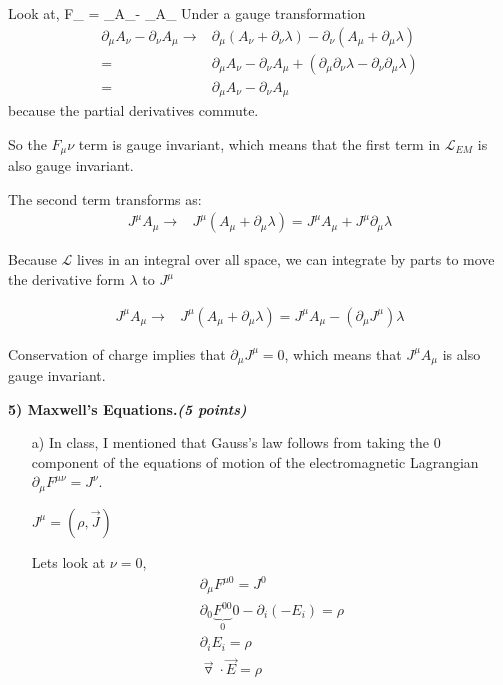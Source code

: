 {{Look at,
\be
F_{\mu\nu} = \partial_\mu A_\nu - \partial_\nu A_\mu
\ee
Under a gauge transformation
\begin{eqnarray*}
\partial_\mu A_\nu - \partial_\nu A_\mu \rightarrow& \partial_\mu (A_\nu + \partial_\nu \lambda) - \partial_\nu (A_\mu + \partial_\mu \lambda)\\
                                        =& \partial_\mu A_\nu - \partial_\nu A_\mu  + (\partial_\mu \partial_\nu \lambda - \partial_\nu \partial_\mu \lambda)\\
                                        =& \partial_\mu A_\nu - \partial_\nu A_\mu  
\end{eqnarray*}
because the partial derivatives commute.

So the $F_\mu\nu$ term is gauge invariant, which means that the first term in $\mathscr{L}_{EM}$ is also gauge invariant.

The second term transforms as:
\begin{eqnarray*}
J^\mu A_\mu \rightarrow& J^\mu(A_\mu + \partial_\mu \lambda) = J^\mu A_\mu + J^\mu  \partial_\mu \lambda
\end{eqnarray*}

Because $\mathscr{L}$ lives in an integral over all space, we can integrate by parts to move the derivative form $\lambda$ to $J^\mu$

\begin{eqnarray*}
J^\mu A_\mu \rightarrow& J^\mu(A_\mu + \partial_\mu \lambda) = J^\mu A_\mu - (\partial_\mu J^\mu)\lambda
\end{eqnarray*}

Conservation of charge implies that $\partial_\mu J^\mu = 0$, which means that $J^\mu A_\mu$ is also gauge invariant.


\vspace*{0.25in}




\textbf{5) Maxwell’s Equations.\hfill \textit{(5 points)}}
\begin{itemize}
\item[a)]In class,  I mentioned  that Gauss’s law follows from taking the 0 component of the equations of motion of the electromagnetic Lagrangian $\partial_\mu F^{\mu\nu} = J^\nu$. 

$J^\mu = (\rho, \vec{J})$

Lets look at $\nu = 0$,
\begin{align}
\partial_\mu F^{\mu0} = J^0 \\
\partial_0 \underbrace{F^{00}}_{0} 0 - \partial_i (-E_i) = \rho \\
\partial_i E_i = \rho \\
\vec{\triangledown} \cdot \vec{E} = \rho \\
\end{align}





\end{itemize}}}
